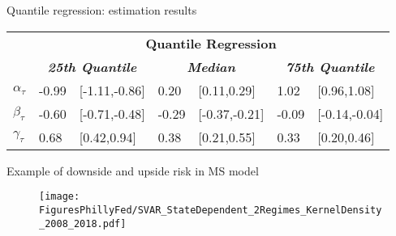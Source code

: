 \documentclass[xcolor=dvipsnames, xcolor=table, 10pt]{beamer}
\newcommand*{\h}{\hspace{0.15cm}}
\begin{document}
\begin{frame}{Quantile regression: estimation results}
\vspace*{-0.25cm}
\small
\begin{table}[ht!]
  \centering
  \begin{threeparttable}
    \begin{tabular}{p{0.5cm} p{} p{1.8cm} p{} p{1.8cm} p{} p{1.8cm} }
      \midrule
      & \multicolumn{6}{c}{\textbf{Quantile Regression}} \\
          \cline{2-7}
     & \multicolumn{2}{c}{\textbf{\textit{25th Quantile}}} & \multicolumn{2}{c}{\textbf{\textit{Median}}} & \multicolumn{2}{c}{\textbf{\textit{75th Quantile}}} \\
     \midrule
     $\alpha_{\tau}$ & -0.99  & [-1.11,-0.86] & \h0.20  & [\h0.11,\h0.29] &  \h1.02 & [\h0.96,\h1.08]\\
$\beta_{\tau}$  & -0.60  & [-0.71,-0.48]  & -0.29  & [-0.37,-0.21] & -0.09 & [-0.14,-0.04] \\
$\gamma_{\tau}$  & \h0.68  & [\h0.42,\h0.94] & \h0.38  & [\h0.21,\h0.55] &  \h0.33 & [\h0.20,\h0.46] \\
    \midrule
    \midrule
    \end{tabular}%
    \end{threeparttable}
  \label{tab:MS_QR_coeff}%
\end{table}%
\normalsize
\hyperlink{main:qrmodel}{}
\end{frame}



\begin{frame}{Example of downside and upside risk in MS model}

\begin{figure}
    \texttt{[image: FiguresPhillyFed/SVAR\_StateDependent\_2Regimes\_KernelDensity\_2008\_2018.pdf]}
\end{figure}

\end{frame}
\end{document}
